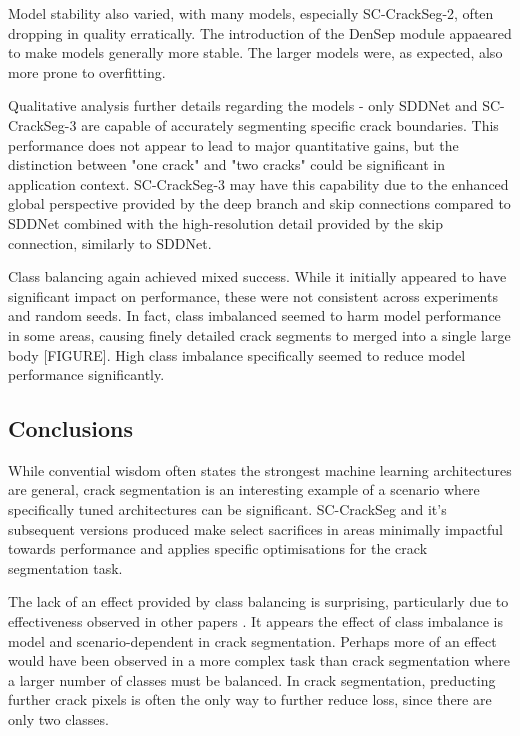 \documentclass[a4paper,12pt]{report}
\begin{document}
Model stability also varied, with many models, especially SC-CrackSeg-2, often dropping in quality erratically. The introduction of the DenSep module appaeared to make models generally more stable. The larger models were, as expected, also more prone to overfitting.

Qualitative analysis further details regarding the models - only SDDNet and SC-CrackSeg-3 are capable of accurately segmenting specific crack boundaries. This performance does not appear to lead to major quantitative gains, but the distinction between "one crack" and "two cracks" could be significant in application context. SC-CrackSeg-3 may have this capability due to the enhanced global perspective provided by the deep branch and skip connections compared to SDDNet combined with the high-resolution detail provided by the skip connection, similarly to SDDNet.

Class balancing again achieved mixed success. While it initially appeared to have significant impact on performance, these were not consistent across experiments and random seeds. In fact, class imbalanced seemed to harm model performance in some areas, causing finely detailed crack segments to merged into a single large body [FIGURE]. High class imbalance specifically seemed to reduce model performance significantly.

\subsection*{Conclusions}

While convential wisdom often states the strongest machine learning architectures are general, crack segmentation is an interesting example of a scenario where specifically tuned architectures can be significant. SC-CrackSeg and it's subsequent versions produced make select sacrifices in areas minimally impactful towards performance and applies specific optimisations for the crack segmentation task.

The lack of an effect provided by class balancing is surprising, particularly due to effectiveness observed in other papers \cite{liu_deepcrack_2019}. It appears the effect of class imbalance is model and scenario-dependent in crack segmentation. Perhaps more of an effect would have been observed in a more complex task than crack segmentation where a larger number of classes must be balanced. In crack segmentation, preducting further crack pixels is often the only way to further reduce loss, since there are only two classes.
\end{document}
